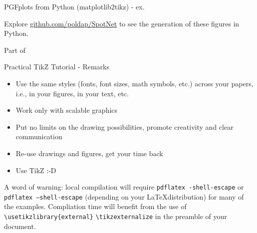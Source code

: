 \documentclass[aspectratio=169]{beamer}
\begin{document}
\begin{frame}{PGFplots from Python (matplotlib2tikz) - ex.}

    \vspace{-10pt}

    \begin{center}
        
    \end{center}
    
    \vspace{-10pt}
    
    Explore \href{https://github.com/poldap/SpotNet}{github.com/poldap/SpotNet} to see the generation of these figures in Python.
    
    \vspace{5pt}
    
    {\footnotesize Part of }
\end{frame}

\begin{frame}{Practical TikZ Tutorial - Remarks}
    \begin{itemize}
        \item Use the same styles (fonts, font sizes, math symbols, etc.) across your papers, i.e., in your figures, in your text, etc.
        \item Work only with scalable graphics
        \item Put no limits on the drawing possibilities, promote creativity and clear communication
        \item Re-use drawings and figures, get your time back
        \item Use TikZ :-D
    \end{itemize}
    A word of warning: local compilation will require \texttt{pdflatex -shell-escape} or \texttt{pdflatex --shell-escape} (depending on your \LaTeX distribution) for many of the examples. Compliation time will benefit from the use of \texttt{\textbackslash usetikzlibrary\{external\}} \texttt{\textbackslash tikzexternalize} in the preamble of your document.
\end{frame}
\end{document}
